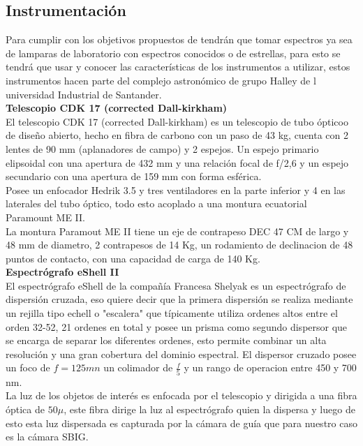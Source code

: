 \subsection{Instrumentación}

 \noindent Para cumplir con los objetivos propuestos de tendrán que tomar espectros ya sea de lamparas de laboratorio con espectros conocidos o de estrellas, para esto se tendrá que usar y conocer las características de los instrumentos a utilizar, estos instrumentos hacen parte del complejo astronómico de grupo Halley de l universidad Industrial de Santander.\\

\noindent \textbf{ Telescopio CDK 17 (corrected Dall-kirkham)}\\

\noindent El telescopio CDK 17 (corrected Dall-kirkham) es un telescopio de tubo ópticoo de diseño abierto, hecho en fibra de carbono con un paso de 43 kg, cuenta con 2 lentes de 90 mm (aplanadores de campo) y 2 espejos. 
Un espejo primario elipsoidal con una apertura de 432 mm y una relación focal de f/2,6 y un espejo secundario con una apertura de 159 mm con forma esférica.\\
Posee un enfocador Hedrik 3.5 y tres ventiladores en la parte inferior y 4 en las laterales del tubo óptico, todo esto acoplado a una montura ecuatorial Paramount ME II.\\
La montura Paramout ME II tiene un eje de contrapeso DEC 47 CM  de largo y 48 mm de diametro, 2 contrapesos de 14 Kg, un rodamiento de declinacion de 48 puntos de contacto, con una capacidad de carga de 140 Kg.\\


\noindent \textbf{Espectrógrafo  eShell II }\\

El espectrógrafo eShell de la compañía Francesa Shelyak es un espectrógrafo de dispersión cruzada, eso quiere decir que la primera dispersión se realiza mediante un rejilla tipo echell  o "escalera" que típicamente utiliza ordenes altos entre el orden 32-52, 21 ordenes en total y posee un prisma como segundo dispersor que se encarga de separar los diferentes ordenes, esto permite combinar un alta resolución y una gran cobertura del dominio espectral.
El dispersor cruzado posee un foco de $f=125 mn$ un colimador de $\frac{f}{5}$ y un rango de operacion entre 450 y 700 nm.\\
La luz de los objetos de interés es enfocada por el telescopio y dirigida a una fibra óptica de $50\mu$, este fibra dirige la luz al espectrógrafo quien la dispersa y luego de esto esta luz dispersada es capturada por la cámara de guía que para nuestro caso es la cámara SBIG.\cite{echell}\\

